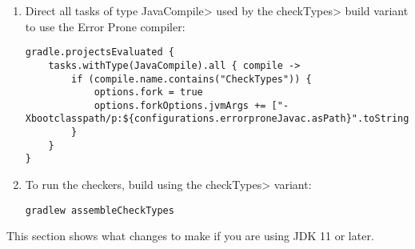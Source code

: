 \begin{enumerate}
\item Direct all tasks of type \<JavaCompile> used by the \<checkTypes>
  build variant to use the Error Prone compiler:
\begin{mysmall}
\begin{Verbatim}
gradle.projectsEvaluated {
    tasks.withType(JavaCompile).all { compile ->
        if (compile.name.contains("CheckTypes")) {
            options.fork = true
            options.forkOptions.jvmArgs += ["-Xbootclasspath/p:${configurations.errorproneJavac.asPath}".toString()]
        }
    }
}
\end{Verbatim}
\end{mysmall}

\item To run the checkers, build using the \<checkTypes> variant:
\begin{Verbatim}
gradlew assembleCheckTypes
\end{Verbatim}
\end{enumerate}

This section shows what changes to make if you are using JDK 11 or later.


